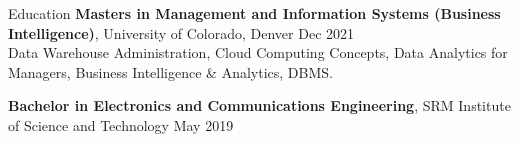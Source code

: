 \documentclass{resume} %
\begin{document}




\vspace{-1em}
\begin{rSection}{Education}
\vspace{-9pt}
{\bf Masters in Management and Information Systems (Business Intelligence)}, University of Colorado, Denver \hfill {
Dec 2021}\\
Data Warehouse Administration, Cloud Computing Concepts, Data Analytics for Managers, Business Intelligence \& Analytics, DBMS.

{\bf Bachelor in Electronics and Communications Engineering}, SRM Institute of Science and Technology \hfill {May 2019}


\end{rSection}
\end{document}
